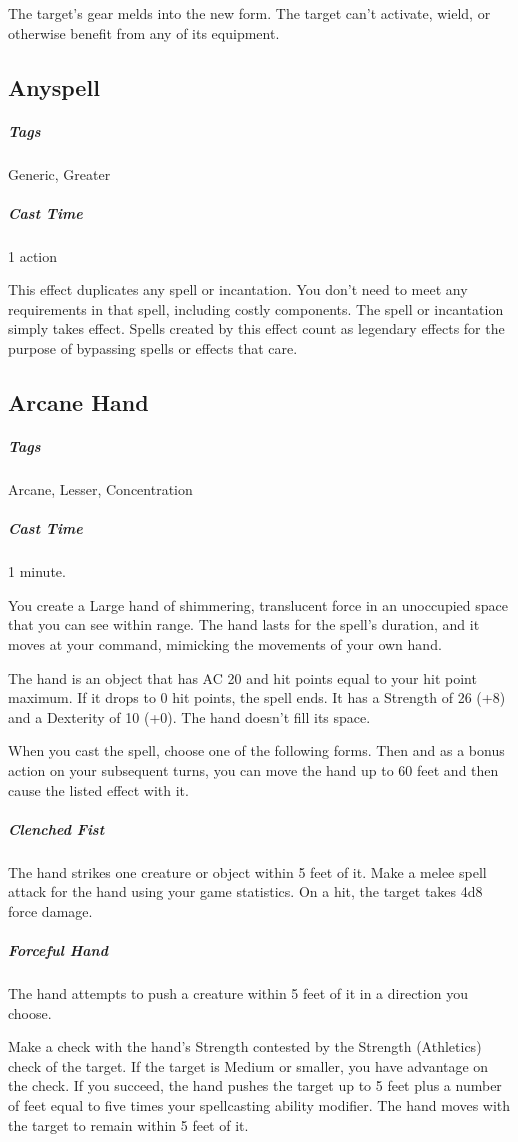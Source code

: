 The target's gear melds into the new form. The target can't activate, wield, or otherwise benefit from any of its equipment.

\subsection{Anyspell}\label{spell:anyspell}
\subparagraph*{Tags} Generic, Greater
\subparagraph*{Cast Time} 1 action

This effect duplicates any spell or incantation. You don't need to meet any requirements in that spell, including costly components. The spell or incantation simply takes effect. Spells created by this effect count as legendary effects for the purpose of bypassing spells or effects that care.

\subsection{Arcane Hand}\label{spell:arcane-hand}
\subparagraph*{Tags} Arcane, Lesser, Concentration
\subparagraph*{Cast Time} 1 minute.

You create a Large hand of shimmering, translucent force in an unoccupied space that you can see within range. The hand lasts for the spell's duration, and it moves at your command, mimicking the movements of your own hand.

The hand is an object that has AC 20 and hit points equal to your hit point maximum. If it drops to 0 hit points, the spell ends. It has a Strength of 26 (+8) and a Dexterity of 10 (+0). The hand doesn't fill its space.

When you cast the spell, choose one of the following forms. Then and as a bonus action on your subsequent turns, you can move the hand up to 60 feet and then cause the listed effect with it.

\subparagraph*{Clenched Fist} The hand strikes one creature or object within 5 feet of it. Make a melee spell attack for the hand using your game statistics. On a hit, the target takes 4d8 force damage.

\subparagraph*{Forceful Hand} The hand attempts to push a creature within 5 feet of it in a direction you choose.

Make a check with the hand's Strength contested by the Strength (Athletics) check of the target. If the target is Medium or smaller, you have advantage on the check. If you succeed, the hand pushes the target up to 5 feet plus a number of feet equal to five times your spellcasting ability modifier. The hand moves with the target to remain within 5 feet of it.

